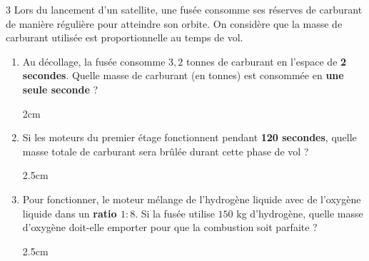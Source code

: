 \documentclass[a4paper]{book}
\begin{document}
{    
    \begin{exerciceNote}{3}
        Lors du lancement d'un satellite, une fusée consomme ses réserves de carburant de manière régulière pour atteindre son orbite. 
        On considère que la masse de carburant utilisée est proportionnelle au temps de vol.
        
        \begin{enumerate}
            \item Au décollage, la fusée consomme $3,2$ tonnes de carburant en l'espace de \textbf{2 secondes}. 
            Quelle masse de carburant (en tonnes) est consommée en \textbf{une seule seconde} ?
            
            \begin{ZoneReponse}{2cm}
            \end{ZoneReponse}
    
            \item Si les moteurs du premier étage fonctionnent pendant \textbf{120 secondes}, quelle masse totale de carburant sera brûlée durant cette phase de vol ?
            
            \begin{ZoneReponse}{2.5cm}
            \end{ZoneReponse}

            \item Pour fonctionner, le moteur mélange de l'hydrogène liquide avec de l'oxygène liquide dans un \textbf{ratio $1:8$}. 
            Si la fusée utilise $150$ kg d'hydrogène, quelle masse d'oxygène doit-elle emporter pour que la combustion soit parfaite ?
            
            \begin{ZoneReponse}{2.5cm}
            \end{ZoneReponse}
        \end{enumerate}
    \end{exerciceNote}

}
\end{document}

